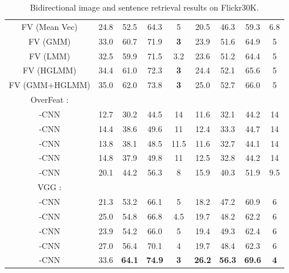 \documentclass[10pt,twocolumn,letterpaper]{article}
\begin{document}
\begin{table*}
\begin{center}
\begin{tabular}{c|cccc|cccc}
        FV (Mean Vec) \cite{klein_cvpr2015} & 24.8 & 52.5 & 64.3 & 5 & 20.5 & 46.3 & 59.3 & 6.8 \\
        FV (GMM) \cite{klein_cvpr2015} & 33.0 & 60.7 & 71.9 & \textbf{3} & 23.9 & 51.6 & 64.9 & 5 \\
        FV (LMM) \cite{klein_cvpr2015} & 32.5 & 59.9 & 71.5 & 3.2 & 23.6 & 51.2 & 64.4 & 5 \\
        FV (HGLMM) \cite{klein_cvpr2015} & 34.4 & 61.0 & 72.3 & \textbf{3} & 24.4 & 52.1 & 65.6 & 5 \\
        FV (GMM+HGLMM) \cite{klein_cvpr2015} & 35.0 & 62.0 & 73.8 & \textbf{3} & 25.0 & 52.7 & 66.0 & 5 \\

        \hline
        \hline
        OverFeat \cite{sermanet_arxiv2014}:&&&&&&&& \\
        -CNN & 12.7 & 30.2 & 44.5 & 14 & 11.6 & 32.1 & 44.2 & 14\\
        -CNN& 14.4 & 38.6 & 49.6 & 11 & 12.4 & 33.3 & 44.7 & 14\\
        -CNN& 13.8 & 38.1 & 48.5 & 11.5&11.6 & 32.7 & 44.1 & 14\\
        -CNN & 14.8 & 37.9 & 49.8 & 11 & 12.5 & 32.8 & 44.2 & 14\\
        -CNN & 20.1 & 44.2 & 56.3 & 8 & 15.9 & 40.3 & 51.9 & 9.5\\
        \hline
        \hline
        VGG \cite{simonyan_arxiv2014}:&&&&&&&& \\
        -CNN & 21.3 & 53.2 & 66.1 & 5 & 18.2 & 47.2 & 60.9 & 6\\
        -CNN& 25.0 & 54.8 & 66.8 & 4.5 & 19.7 & 48.2 & 62.2 & 6\\
        -CNN& 23.9 & 54.2 & 66.0 & 5 & 19.4 & 49.3 & 62.4 & 6\\
        -CNN & 27.0 & 56.4 & 70.1 & 4 & 19.7 & 48.4 & 62.3 & 6\\
        -CNN & {33.6} & \textbf{64.1} & \textbf{74.9} & \textbf{3} & \textbf{26.2} & \textbf{56.3} & \textbf{69.6} & \textbf{4}\\
        \hline
        \hline

    \end{tabular}


\end{center}
\caption{Bidirectional image and sentence retrieval results on Flickr30K.}\label{table:flickr30k}
\end{table*}
\end{document}
